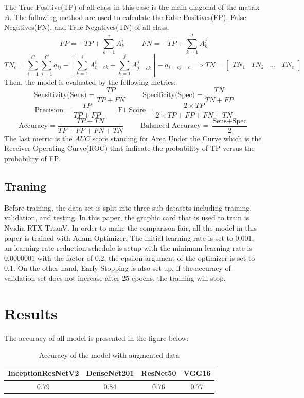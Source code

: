 \documentclass[sensors,article,submit,pdftex,moreauthors]{Definitions/mdpi}
\begin{document}
The True Positive(TP) of all class in this case is the main diagonal of the matrix $A$. The following method are used to calculate the False Positives(FP), False Negatives(FN), and True Negatives(TN) of all class:
\[
FP = -TP + \sum_{k=1}^{i}A^i_k \hspace{1cm} FN = -TP + \sum_{k=1}^{j}A^j_k
\]
\[
TN_c = \sum_{i=1}^{C}\sum_{j=1}^{C}a_{ij} - \left[ \sum_{k=1}^{i}A^i_{i=c k} + \sum_{k=1}^{j}A^j_{j=c k} \right] + a_{i=c j=c} \implies TN = \begin{bmatrix}
	TN_1 & TN_2 & \dots & TN_c
\end{bmatrix}
\]
Then, the model is evaluated by the following metrics:
\[\text{Sensitivity(Sens)} = \frac{TP}{TP + FN} \hspace{1cm} \text{Specificity(Spec)} = \frac{TN}{TN + FP}\]
\[\text{Precision} = \frac{TP}{TP + FP} \hspace{1cm} \text{F1 Score} = \frac{2 \times TP}{2 \times TP + FP + FN + TN}\]
\[\text{Accuracy} = \frac{TP + TN}{TP + FP + FN + TN} \hspace{1cm} \text{Balanced Accuracy} = \frac{\text{Sens} + \text{Spec}}{2}\]
The last metric is the $AUC$ score standing for Area Under the Curve which is the Receiver Operating Curve(ROC) that indicate the probability of TP versus the probability of FP.  
\subsection{Traning}
Before training, the data set is split into three sub datasets including training, validation, and testing. In this paper, the graphic card that is used to train is Nvidia RTX TitanV. In order to make the comparison fair, all the model in this paper is trained with Adam Optimizer\cite{6980}. The initial learning rate is set to $0.001$, an learning rate reduction schedule is setup with the minimum learning rate is $0.0000001$ with the factor of $0.2$, the epsilon argument of the optimizer is set to $0.1$. On the other hand, Early Stopping is also set up, if the accuracy of validation set does not increase after 25 epochs, the training will stop. 

\section{Results}
The accuracy of all model is presented in the figure below:

\begin{table}[H]
	\centering
	\begin{tabular}{| c | c | c | c |}
		\hline
		InceptionResNetV2 & DenseNet201 & ResNet50 & VGG16 \\
		\hline
		0.79 & 0.84 & 0.76 & 0.77\\
		\hline
	\end{tabular}
	\caption{Accuracy of the model with augmented data}
	\label{table:Acc-Augment-Model}
\end{table}
\end{document}
